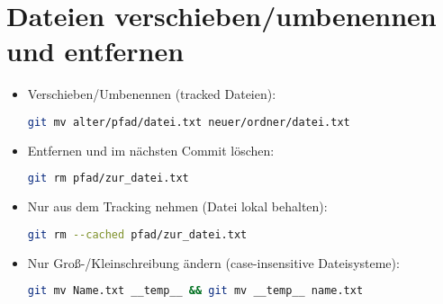 \documentclass[a4paper,11pt]{article}
\begin{document}
	\section{Dateien verschieben/umbenennen und entfernen}
	\begin{itemize}
		\item Verschieben/Umbenennen (tracked Dateien):
		\begin{lstlisting}[language=bash]
			git mv alter/pfad/datei.txt neuer/ordner/datei.txt
		\end{lstlisting}
		\item Entfernen und im n\"achsten Commit l\"oschen:
		\begin{lstlisting}[language=bash]
			git rm pfad/zur_datei.txt
		\end{lstlisting}
		\item Nur aus dem Tracking nehmen (Datei lokal behalten):
		\begin{lstlisting}[language=bash]
			git rm --cached pfad/zur_datei.txt
		\end{lstlisting}
		\item Nur Gro\ss-/Kleinschreibung \"andern (case-insensitive Dateisysteme):
		\begin{lstlisting}[language=bash]
			git mv Name.txt __temp__ && git mv __temp__ name.txt
		\end{lstlisting}
	\end{itemize}
	
\end{document}
